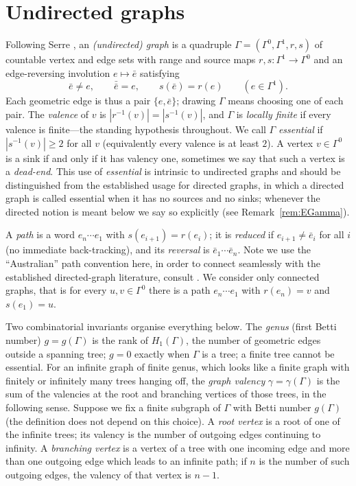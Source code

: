 \documentclass[12pt,reqno]{amsart}
\theoremstyle{plain}
\theoremstyle{definition}
\begin{document}
\section{Undirected graphs}\label{sec:graphs}

Following Serre \cite{Serre}, an \emph{(undirected) graph} is a quadruple
$\Gamma=(\Gamma^0,\Gamma^1,r,s)$ of countable vertex and edge sets with range and source maps
$r,s\colon\Gamma^1\to\Gamma^0$ and an edge-reversing involution $e\mapsto\bar e$ satisfying
\[
\bar e\neq e,\qquad \bar{\bar e}=e,\qquad s(\bar e)=r(e)\qquad(e\in\Gamma^1).
\]
Each geometric edge is thus a pair $\{e,\bar e\}$; drawing $\Gamma$ means choosing one of each pair.
The \emph{valence} of $v$ is $|r^{-1}(v)|=|s^{-1}(v)|$, and $\Gamma$ is \emph{locally finite} if every
valence is finite---the standing hypothesis throughout. We call $\Gamma$ \emph{essential} if
$|s^{-1}(v)|\ge 2$ for all $v$ (equivalently every valence is at least $2$). A vertex $v \in \Gamma^0$ is a sink if and only if it has valency one, sometimes we say that such a vertex is a \emph{dead-end}. This use of \emph{essential} is intrinsic to undirected graphs and should be distinguished from the established usage for directed graphs, in which a directed graph is called essential when it has no sources and no sinks; whenever the directed notion is meant below we say so explicitly (see Remark~\ref{rem:EGamma}).

A \emph{path} is a word
$e_n\cdots e_1$ with $s(e_{i+1})=r(e_i)$; it is \emph{reduced} if $e_{i+1}\neq\bar e_i$ for all $i$
(no immediate back-tracking), and its \emph{reversal} is $\bar e_1\cdots\bar e_n$. Note we use the ``Australian'' path convention here, in order to connect seamlessly with the established directed-graph literature, consult \cite{Raeburn}. We consider only connected graphs, that is for every $u,v \in \Gamma^0$ there is a path $e_n  \cdots e_1$ with $r(e_n)=v$ and $s(e_1)=u$.

Two combinatorial invariants organise everything below. The \emph{genus} (first Betti number)
$g=g(\Gamma)$ is the rank of $H_1(\Gamma)$, the number of geometric edges outside a spanning tree;
$g=0$ exactly when $\Gamma$ is a tree; a finite tree cannot be essential. For an infinite graph of
finite genus, which looks like a finite graph with finitely or infinitely many trees hanging off, the
\emph{graph valency} $\gamma=\gamma(\Gamma)$ is the sum of the valencies at the root and branching
vertices of those trees, in the following sense. Suppose we fix a finite subgraph of $\Gamma$ with
Betti number $g(\Gamma)$ \textup(the definition does not depend on this choice\textup). A
\emph{root vertex} is a root of one of the infinite trees; its valency is the number of outgoing
edges continuing to infinity. A \emph{branching vertex} is a vertex of a tree with one incoming
edge and more than one outgoing edge which leads to an infinite path; if $n$ is the number of such
outgoing edges, the valency of that vertex is $n-1$.
\end{document}
